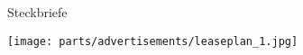 \subtitle{Lehrer}{Steckbriefe}
\vfill
\begin{center}
    \texttt{[image: parts/advertisements/leaseplan\_1.jpg]}
\end{center}
